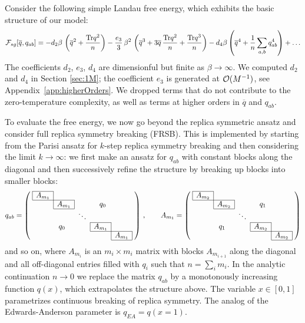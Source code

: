 \documentclass[aps,prx,preprint,onecolumn,citeautoscript,superscriptaddress,nofootinbib,
eqsecnum]{revtex4}
\begin{document}
{Consider the following simple Landau free energy, which exhibits the basic structure of our model:
\begin{equation}
\label{eq:Ftoy}
{\cal F}_{sg}[\overline{q},q_{ab}] = - d_2 \beta\,  \left(\overline{q}^2 + \frac{\text{Tr} q^2}{n} \right) - \frac{e_3}{3} \, \beta^2 \, \left( \overline{q}^3 +3\overline{q} \, \frac{\text{Tr}q^2}{n} + \frac{\text{Tr}q^3}{n} \right) -d_4 \beta \left( \overline{q}^4 + \frac{1}{n} \sum_{a ,b} q_{ab}^4 \right) + \ldots
\end{equation}
The coefficients $d_2$, $e_3$, $d_4$ are dimensionful but finite as $\beta \rightarrow \infty$. We computed $d_2$ and $d_4$ in Section \ref{sec:1M}; the coefficient $e_3$ is generated at ${\cal O}(M^{-1})$, see Appendix~\ref{app:higherOrders}. We dropped terms that do not contribute to the zero-temperature complexity, as well as terms at higher orders in $\overline q$ and $q_{ab}$.

To evaluate the free energy, we now go beyond the replica symmetric ansatz and consider full replica symmetry breaking (FRSB). This is implemented by starting from the Parisi ansatz for $k$-step replica symmetry breaking and then considering the limit $k\rightarrow \infty$: we first make an ansatz for $q_{ab}$ with constant blocks along the diagonal and then successively refine the structure by breaking up blocks into smaller blocks:
\begin{equation}
q_{ab}
=\left( \; \begin{array}{ccccc}
\cline{1-1} 
\multicolumn{1}{|c|}{A_{m_1}} & & & &  \\ \cline{1-2} 
 &  \multicolumn{1}{|c|}{A_{m_1}} &  & \;\; q_0 & \\ \cline{2-2}
 & & \ddots & & \\  \cline{4-4}
 & q_0 \;\; & & \multicolumn{1}{|c|}{A_{m_1}}    & \\  \cline{4-5}
 &  & &  & \multicolumn{1}{|c|}{A_{m_1}}    \\  \cline{5-5}
\end{array} \; \right)  \,,
\qquad
A_{m_1} =\left( \; \begin{array}{ccccc}
\cline{1-1} 
\multicolumn{1}{|c|}{A_{m_2}} & & & &  \\ \cline{1-2} 
 &  \multicolumn{1}{|c|}{A_{m_2}} &  & \;\; q_1 & \\ \cline{2-2}
 & & \ddots & & \\  \cline{4-4}
 & q_1 \;\; & & \multicolumn{1}{|c|}{A_{m_2}}    & \\  \cline{4-5}
 &  & &  & \multicolumn{1}{|c|}{A_{m_2}}    \\  \cline{5-5}
\end{array} \; \right) 
\end{equation}
and so on, where $A_{m_i}$ is an $m_i\times m_i$ matrix with blocks $A_{m_{i+1}}$ along the diagonal and all off-diagonal entries filled with $q_{i}$ such that $n = \sum_i m_i$.
In the analytic continuation $n\rightarrow 0$ we replace the matrix $q_{ab}$ by a monotonously increasing function $q(x)$, which extrapolates the structure above. The variable $x\in [0,1]$ parametrizes continuous breaking of replica symmetry. The analog of the Edwards-Anderson parameter is $q_{EA} = q(x=1)$. 

}
\end{document}

